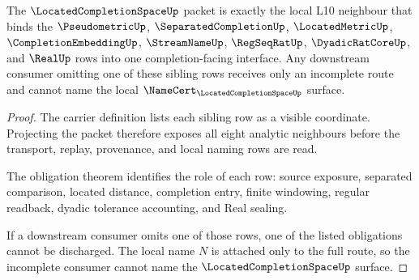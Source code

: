 \begin{theorem}
\label{thm:located-completion-space-l10-neighbour-handoff}
The $\LocatedCompletionSpaceUp$ packet is exactly the local L10 neighbour that binds the $\PseudometricUp$, $\SeparatedCompletionUp$, $\LocatedMetricUp$, $\CompletionEmbeddingUp$, $\StreamNameUp$, $\RegSeqRatUp$, $\DyadicRatCoreUp$, and $\RealUp$ rows into one completion-facing interface. Any downstream consumer omitting one of these sibling rows receives only an incomplete route and cannot name the local $\NameCert_{\LocatedCompletionSpaceUp}$ surface.
\end{theorem}
\begin{proof}
The carrier definition lists each sibling row as a visible coordinate. Projecting the packet therefore exposes all eight analytic neighbours before the transport, replay, provenance, and local naming rows are read.

The obligation theorem identifies the role of each row: source exposure, separated comparison, located distance, completion entry, finite windowing, regular readback, dyadic tolerance accounting, and Real sealing.

If a downstream consumer omits one of those rows, one of the listed obligations cannot be discharged. The local name $N$ is attached only to the full route, so the incomplete consumer cannot name the $\LocatedCompletionSpaceUp$ surface.
\end{proof}




